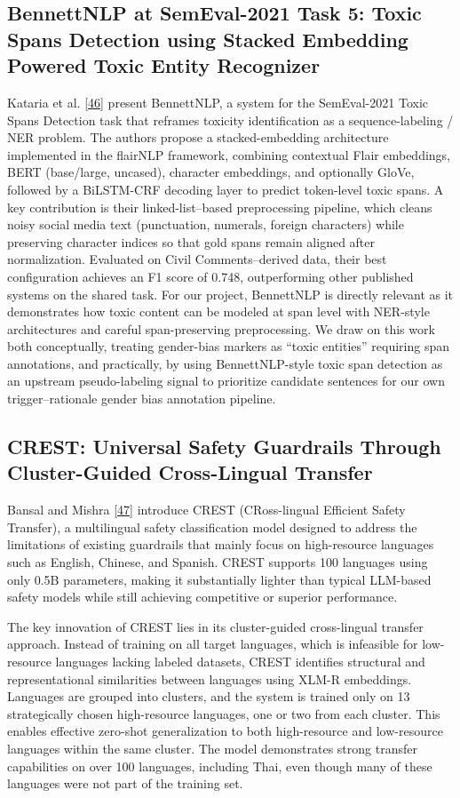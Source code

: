 \documentclass[12pt,oneside,openright,a4paper]{cpe-english-project}
\begin{document}
\subsection{BennettNLP at SemEval-2021 Task 5: Toxic Spans Detection using Stacked Embedding Powered Toxic Entity Recognizer}

Kataria et al. \hyperlink{bib:ref46}{[46]} present BennettNLP, a system for the SemEval-2021 Toxic Spans Detection task that reframes toxicity identification as a sequence-labeling / NER problem. The authors propose a stacked-embedding architecture implemented in the flairNLP framework, combining contextual Flair embeddings, BERT (base/large, uncased), character embeddings, and optionally GloVe, followed by a BiLSTM-CRF decoding layer to predict token-level toxic spans. A key contribution is their linked-list--based preprocessing pipeline, which cleans noisy social media text (punctuation, numerals, foreign characters) while preserving character indices so that gold spans remain aligned after normalization. Evaluated on Civil Comments--derived data, their best configuration achieves an F1 score of 0.748, outperforming other published systems on the shared task. For our project, BennettNLP is directly relevant as it demonstrates how toxic content can be modeled at span level with NER-style architectures and careful span-preserving preprocessing. We draw on this work both conceptually, treating gender-bias markers as “toxic entities” requiring span annotations, and practically, by using BennettNLP-style toxic span detection as an upstream pseudo-labeling signal to prioritize candidate sentences for our own trigger--rationale gender bias annotation pipeline.

\subsection{CREST: Universal Safety Guardrails Through Cluster-Guided Cross-Lingual Transfer}

Bansal and Mishra \hyperlink{bib:ref47}{[47]} introduce CREST (CRoss-lingual Efficient Safety Transfer), a multilingual safety classification model designed to address the limitations of existing guardrails that mainly focus on high-resource languages such as English, Chinese, and Spanish. CREST supports 100 languages using only 0.5B parameters, making it substantially lighter than typical LLM-based safety models while still achieving competitive or superior performance.

The key innovation of CREST lies in its cluster-guided cross-lingual transfer approach. Instead of training on all target languages, which is infeasible for low-resource languages lacking labeled datasets, CREST identifies structural and representational similarities between languages using XLM-R embeddings. Languages are grouped into clusters, and the system is trained only on 13 strategically chosen high-resource languages, one or two from each cluster. This enables effective zero-shot generalization to both high-resource and low-resource languages within the same cluster. The model demonstrates strong transfer capabilities on over 100 languages, including Thai, even though many of these languages were not part of the training set.
\end{document}
